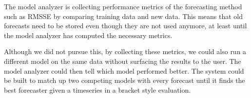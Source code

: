 The model analyzer is collecting performance metrics of the forecasting method such as RMSSE by comparing training data and new data. This means that old forecasts need to be stored even though they are not used anymore, at least until the model analyzer has computed the necessary metrics.

Although we did not pursue this, by collecting these metrics, we could also run a different model on the same data without surfacing the results to the user. The model analyzer could then tell which model performed better. The system could be built to match up two competing models with every forecast until it finds the best forecaster given a timeseries in a bracket style evaluation.
